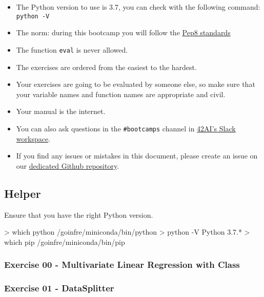 \documentclass[]{article}
\newenvironment{Shaded}{\begin{snugshade}}{\end{snugshade}}
\newcommand{\NormalTok}[1]{\textcolor[rgb]{0.81,0.81,0.76}{#1}}
\begin{document}
\begin{itemize}
\item
  The Python version to use is 3.7, you can check with the following
  command: \texttt{python\ -V}
\item
  The norm: during this bootcamp you will follow the
  \href{https://www.python.org/dev/peps/pep-0008/}{Pep8 standards}
\item
  The function \texttt{eval} is never allowed.
\item
  The exercises are ordered from the easiest to the hardest.
\item
  Your exercises are going to be evaluated by someone else, so make sure
  that your variable names and function names are appropriate and civil.
\item
  Your manual is the internet.
\item
  You can also ask questions in the \texttt{\#bootcamps} channel in
  \href{https://42-ai.slack.com}{42AI's Slack workspace}.
\item
  If you find any issues or mistakes in this document, please create an
  issue on our
  \href{https://github.com/42-AI/bootcamp_machine-learning/issues}{dedicated
  Github repository}.
\end{itemize}

\hypertarget{helper}{%
\subsection{Helper}\label{helper}}

Ensure that you have the right Python version.

\begin{Shaded}
\begin{Highlighting}[]
\NormalTok{> which python}
\NormalTok{/goinfre/miniconda/bin/python}
\NormalTok{> python -V}
\NormalTok{Python 3.7.*}
\NormalTok{> which pip}
\NormalTok{/goinfre/miniconda/bin/pip}
\end{Highlighting}
\end{Shaded}

\hypertarget{exercise-00---multivariate-linear-regression-with-class}{%
\subsubsection{Exercise 00 - Multivariate Linear Regression with
Class}\label{exercise-00---multivariate-linear-regression-with-class}}

\hypertarget{exercise-01---datasplitter}{%
\subsubsection{Exercise 01 -
DataSplitter}\label{exercise-01---datasplitter}}
\end{document}
